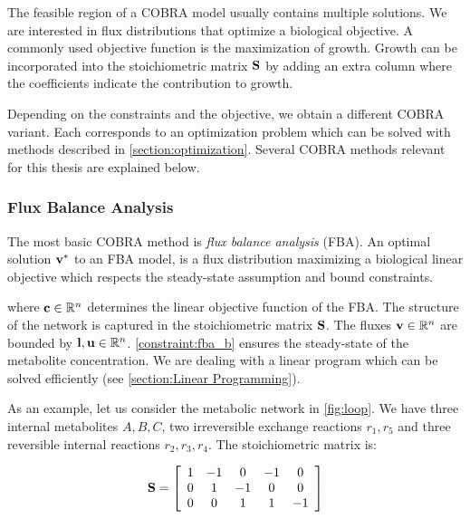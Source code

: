 The feasible region of a COBRA model usually contains multiple solutions. We are interested in flux distributions that optimize a biological objective. A commonly used objective function is the maximization of growth. Growth can be incorporated into the stoichiometric matrix $\bold S$ by adding an extra column where the coefficients indicate the contribution to growth.  \cite{FBA}

Depending on the constraints and the objective, we obtain a different COBRA variant. Each corresponds to an optimization problem which can be solved with methods described in \cref{section:optimization}. Several COBRA methods relevant for this thesis are explained below.

\subsubsection{Flux Balance Analysis} \label{section:fba}
The most basic COBRA method is \textit{flux balance analysis} (FBA). An optimal solution $\bold v^*$ to an FBA model, is a flux distribution maximizing a biological linear objective which respects the steady-state assumption and bound constraints.


where $\bold c \in \mathbb{R}^n$ determines the linear objective function of the FBA. The structure of the network is captured in the stoichiometric matrix $\bold S$. The fluxes $\bold v \in \mathbb{R}^n$ are bounded by $\bold l, \bold u \in \mathbb{R}^n$. \cref{constraint:fba_b} ensures the steady-state of the metabolite concentration. We are dealing with a linear program which can be solved efficiently (see \cref{section:Linear Programming}).

As an example, let us consider the metabolic network in \cref{fig:loop}. We have three internal metabolites $A,B,C$, two irreversible exchange reactions $r_1, r_5$ and three reversible internal reactions $r_2, r_3, r_4$. The stoichiometric matrix is: 

\begin{equation} \label{Eq:S_loop}
    \bold S =
    \left[\begin{array}{ccccc}
        1 & -1 & 0 & -1 & 0 \\
        0 & 1 & -1 & 0 & 0 \\
        0 & 0 & 1 & 1 & -1 \\
    \end{array}\right]        
\end{equation}

